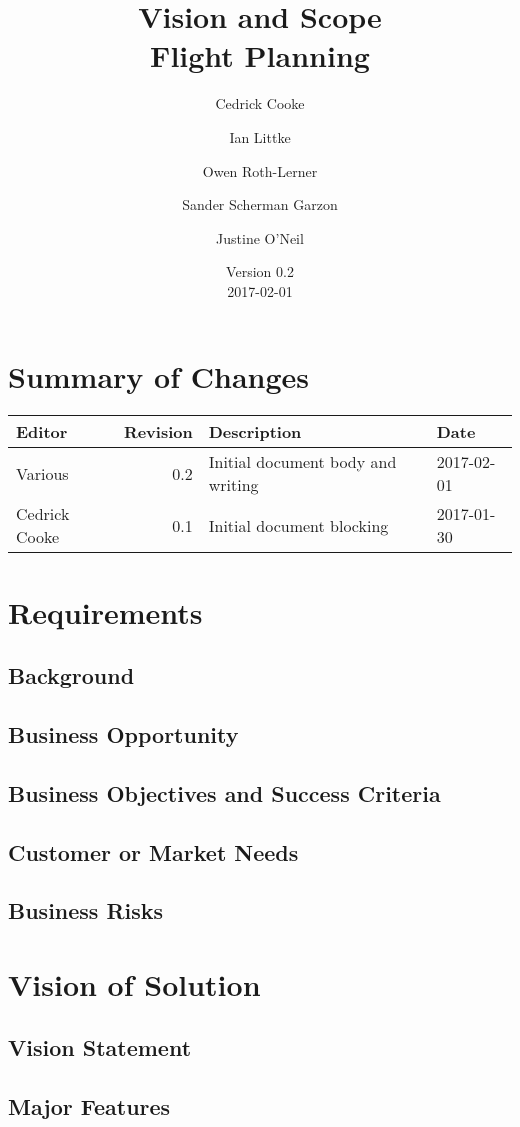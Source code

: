 \documentclass[12pt, letterpaper]{article}
\title{Vision and Scope \\
Flight Planning
}
\author{ Cedrick Cooke
    \and Ian Littke
    \and Owen Roth-Lerner
    \and Sander Scherman Garzon
    \and Justine O'Neil
}
\date{Version 0.2 \\ 2017-02-01}
\begin{document}
\maketitle

\tableofcontents

\section*{Summary of Changes}
\begin{tabularx}{\textwidth}{|l|r|X|l|}
\hline
Editor & Revision & Description & Date \\ \hline \hline
Various & 0.2 & Initial document body and writing & 2017-02-01 \\ \hline
Cedrick Cooke & 0.1 & Initial document blocking & 2017-01-30 \\ \hline
\end{tabularx}

\section{Requirements}
\subsection{Background}
\subsection{Business Opportunity}
\subsection{Business Objectives and Success Criteria}
\subsection{Customer or Market Needs}
\subsection{Business Risks}

\section{Vision of Solution}
\subsection{Vision Statement}
\subsection{Major Features}
\end{document}
